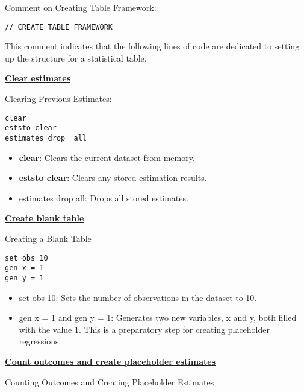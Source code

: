 \documentclass{article}
\begin{document}
Comment on Creating Table Framework:
\begin{mdframed}
\begin{verbatim}
// CREATE TABLE FRAMEWORK
\end{verbatim}
\end{mdframed}

This comment indicates that the following lines of code are dedicated to setting up the structure for a statistical table.

\underline{\textbf{Clear estimates}}

\vspace{0.3cm} Clearing Previous Estimates:

\begin{mdframed}
\begin{verbatim}
clear
eststo clear
estimates drop _all
\end{verbatim}
\end{mdframed}

\begin{itemize}
    \item 	\textbf{clear}: Clears the current dataset from memory.
    \item \textbf{eststo clear}: Clears any stored estimation results.
    \item estimates drop all: Drops all stored estimates.
\end{itemize}

\underline{\textbf{Create blank table}}

\vspace{0.3cm}Creating a Blank Table

\begin{mdframed}
\begin{verbatim}
set obs 10
gen x = 1
gen y = 1
\end{verbatim}
\end{mdframed}

\begin{itemize}
    \item set obs 10: Sets the number of observations in the dataset to 10.
    \item gen x = 1 and gen y = 1: Generates two new variables, x and y, both filled with the value 1. This is a preparatory step for creating placeholder regressions.
\end{itemize}

\underline{\textbf{Count outcomes and create placeholder estimates}}

\vspace{0.3cm} Counting Outcomes and Creating Placeholder Estimates
\end{document}
